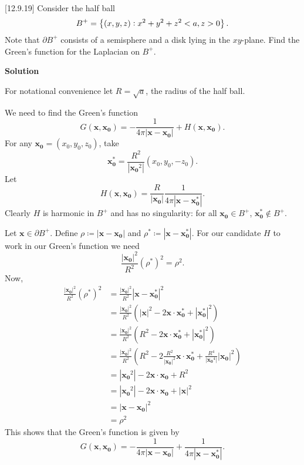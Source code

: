 \documentclass{article}
\def\*#1{\mathbf{#1}}
\begin{document}
[12.9.19] Consider the half ball
%
\begin{equation*}
    B^+ = \cbr[1]{(x, y, z): x^2 + y^2 + z^2 < a, z > 0}
    .
\end{equation*}
%
Note that $\partial B^+$ consists of a semisphere and a disk lying in
the $x y$-plane. Find the Green's function for the Laplacian on $B^+$.

\textbf{Solution}

For notational convenience let $R = \sqrt{a}$, the radius of the half
ball.

We need to find the Green's function
%
\begin{equation*}
    G(\*x, \*{x_0}) = - \frac{1}{4 \pi |\*x - \*{x_0}|} + H(\*x, \*{x_0})
    .
\end{equation*}
%
For any $\*{x_0} = (x_0, y_0, z_0)$, take
%
\begin{equation*}
    \*{x_0^*} = \frac{R^2}{|\*{x_0}^2|} (x_0, y_0, -z_0)
    .
\end{equation*}
%
Let
%
\begin{equation*}
    H(\*{x}, \*{x_0}) = \frac{R}{|\*{x_0}|} \frac{1}{4 \pi |\*x - \*{x_0^*}|}
    .
\end{equation*}
%
Clearly $H$ is harmonic in $B^+$ and has no singularity: for all
$\*{x_0} \in B^+$, $\*{x_0^*} \notin B^+$.

Let $\*x \in \partial B^+$. Define $\rho \coloneqq |\*x - \*{x_0}|$ and
$\rho^* \coloneqq |\*x - \*{x_0^*}|$. For our candidate $H$ to work in
our Green's function we need
%
\begin{equation*}
    \frac{|\*{x_0}|^2}{R^2} (\rho^*)^2 = \rho^2
    .
\end{equation*}
%
Now,
%
\begin{align*}
    \frac{|\*{x_0}|^2}{R^2} (\rho^*)^2
        &= \frac{|\*{x_0}|^2}{R^2} |\*x - \*{x_0^*}|^2 \\
        &= \frac{|\*{x_0}|^2}{R^2} (|\*x|^2 - 2 \*x \cdot \*{x_0^*} + |\*{x_0^*}|^2) \\
        &= \frac{|\*{x_0}|^2}{R^2} (R^2 - 2 \*x \cdot \*{x_0^*} + |\*{x_0^*}|^2) \\
        &= \frac{|\*{x_0}|^2}{R^2} (R^2 - 2 \frac{R^2}{|\*{x_0}|^2} \*x \cdot \*{x_0^*} + \frac{R^4}{|\*{x_0}^4|} |\*{x_0}|^2) \\
        &= |\*{x_0}^2| - 2 \*x \cdot \*{x_0} + R^2 \\
        &= |\*{x_0}^2| - 2 \*x \cdot \*{x_0} + |\*x|^2 \\
        &= |\*x - \*{x_0}|^2 \\
        &= \rho^2
\end{align*}
%
This shows that the Green's function is given by
%
\begin{equation*}
    G(\*x, \*{x_0}) = - \frac{1}{4 \pi |\*x - \*{x_0}|} + \frac{1}{4 \pi |\*x - \*{x_0^*}|}
    .
\end{equation*}
\end{document}

